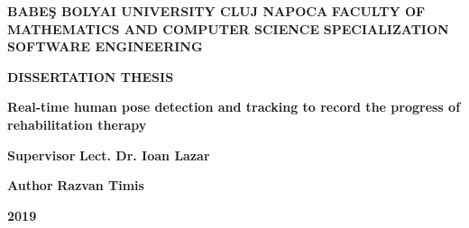 
\begin{titlepage}
\sloppy
\begin{center}
\fontsize{16}{18} \textbf{BABE\c S BOLYAI UNIVERSITY CLUJ NAPOCA}
\break \break 
\fontsize{16}{18} \textbf{FACULTY OF MATHEMATICS AND COMPUTER SCIENCE}
\break \break 
\fontsize{16}{18} \textbf{SPECIALIZATION SOFTWARE ENGINEERING}

\vspace{5cm}

\fontsize{18}{18} \textbf{DISSERTATION THESIS}

\vspace{1cm}

\fontsize{22}{18} \textbf{Real-time human pose detection and tracking to record the progress of rehabilitation therapy}

\end{center}

\vspace{5cm}

\begin{flushleft}
\fontsize{16}{18} \textbf{Supervisor} \break
\Large{\textbf{Lect. Dr. Ioan Lazar}}
\end{flushleft}

\begin{flushright}
\fontsize{16}{18} \textbf{Author} \break
\Large{\textbf{Razvan Timis}}
\end{flushright}

\vspace{3cm}

\begin{center}
\fontsize{16}{18} \textbf{2019}
\end{center}

\end{titlepage}